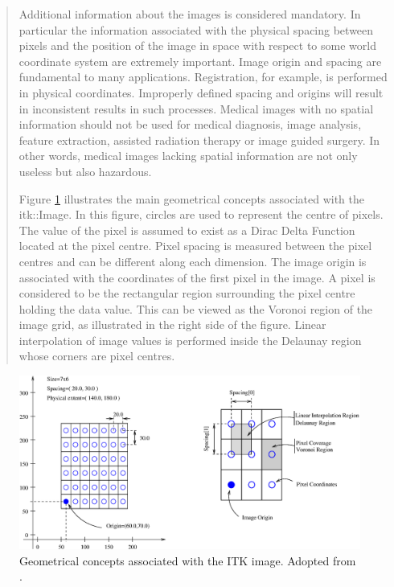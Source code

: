 \documentclass[]{report}
\begin{document}
\begin{quote}
Additional information about the images is considered mandatory.
In particular the information associated with the physical spacing
between pixels and the position of the image in space with respect
to some world coordinate system are extremely important. Image
origin and spacing are fundamental to many applications.
Registration, for example, is performed in physical coordinates.
Improperly defined spacing and origins will result in inconsistent
results in such processes. Medical images with no spatial
information should not be used for medical diagnosis, image
analysis, feature extraction, assisted radiation therapy or image
guided surgery. In other words, medical images lacking spatial
information are not only useless but also hazardous.

Figure \ref{fig:image} illustrates the main geometrical concepts
associated with the itk::Image. In this figure, circles are used
to represent the centre of pixels. The value of the pixel is
assumed to exist as a Dirac Delta Function located at the pixel
centre. Pixel spacing is measured between the pixel centres and
can be different along each dimension. The image origin is
associated with the coordinates of the first pixel in the image. A
pixel is considered to be the rectangular region surrounding the
pixel centre holding the data value. This can be viewed as the
Voronoi region of the image grid, as illustrated in the right side
of the figure. Linear interpolation of image values is performed
inside the Delaunay region whose corners are pixel centres.
\end{quote}

\begin{figure}
\centering
\includegraphics[width=12cm]{ImageOriginAndSpacing.eps}
\caption{Geometrical concepts associated with the ITK image.
Adopted from \citet{ITKSoftwareGuideSecondEdition}.}
\label{fig:image}
\end{figure}
\end{document}
